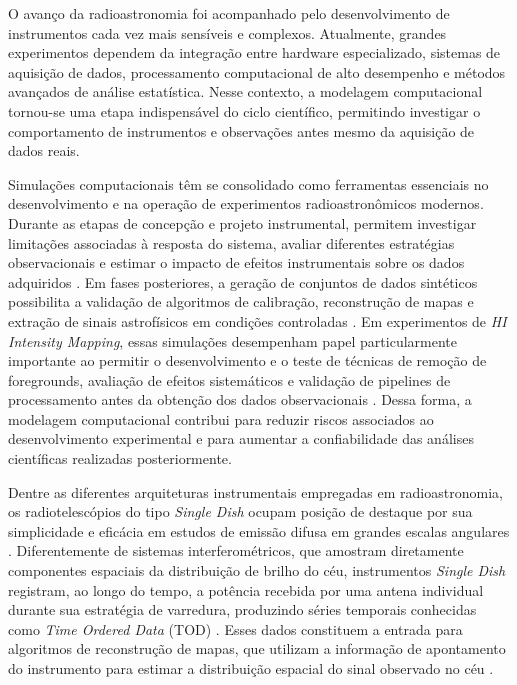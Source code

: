 O avanço da radioastronomia foi acompanhado pelo desenvolvimento de instrumentos cada vez mais sensíveis e complexos. Atualmente, grandes experimentos dependem da integração entre hardware especializado, sistemas de aquisição de dados, processamento computacional de alto desempenho e métodos avançados de análise estatística. Nesse contexto, a modelagem computacional tornou-se uma etapa indispensável do ciclo científico, permitindo investigar o comportamento de instrumentos e observações antes mesmo da aquisição de dados reais.

Simulações computacionais têm se consolidado como ferramentas essenciais no desenvolvimento e na operação de experimentos radioastronômicos modernos. Durante as etapas de concepção e projeto instrumental, permitem investigar limitações associadas à resposta do sistema, avaliar diferentes estratégias observacionais e estimar o impacto de efeitos instrumentais sobre os dados adquiridos \cite{saliwanchik2021hirax,wilson2013tools}. Em fases posteriores, a geração de conjuntos de dados sintéticos possibilita a validação de algoritmos de calibração, reconstrução de mapas e extração de sinais astrofísicos em condições controladas \cite{bigotsazy2015simulations}. Em experimentos de \textit{HI Intensity Mapping}, essas simulações desempenham papel particularmente importante ao permitir o desenvolvimento e o teste de técnicas de remoção de foregrounds, avaliação de efeitos sistemáticos e validação de pipelines de processamento antes da obtenção dos dados observacionais \cite{Zhang2023}. Dessa forma, a modelagem computacional contribui para reduzir riscos associados ao desenvolvimento experimental e para aumentar a confiabilidade das análises científicas realizadas posteriormente.

Dentre as diferentes arquiteturas instrumentais empregadas em radioastronomia, os radiotelescópios do tipo \textit{Single Dish} ocupam posição de destaque por sua simplicidade e eficácia em estudos de emissão difusa em grandes escalas angulares \cite{selvaraj2021all}. Diferentemente de sistemas interferométricos, que amostram diretamente componentes espaciais da distribuição de brilho do céu, instrumentos \textit{Single Dish} registram, ao longo do tempo, a potência recebida por uma antena individual durante sua estratégia de varredura, produzindo séries temporais conhecidas como \textit{Time Ordered Data} (TOD) \cite{wilson2013tools,bigotsazy2015simulations}. Esses dados constituem a entrada para algoritmos de reconstrução de mapas, que utilizam a informação de apontamento do instrumento para estimar a distribuição espacial do sinal observado no céu \cite{tegmark1997mapmaking}.

